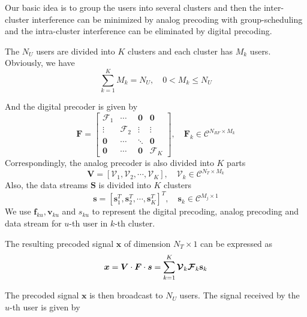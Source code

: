 \documentclass[conference]{IEEEtran}
\begin{document}
Our basic idea is to group the users into several clusters and then the inter-cluster interference can be minimized by analog precoding with group-scheduling and the intra-cluster interference can be eliminated by digital precoding.

The $N_U$ users are divided into $K$ clusters and each cluster has $M_k$ users. Obviously, we have
\begin{equation}
	\sum_{k=1}^{K} M_k = N_U, \quad 0< M_k\leq N_U
\end{equation}

And the digital precoder is given by 
\begin{equation}
\bm{F} = 
\begin{bmatrix}
\bm{\mathcal{F}}_1&\cdots & \bm{0}&\bm{0}\\
\vdots & \bm{\mathcal{F}}_2 & \vdots&\vdots \\
\bm{0}&\cdots&\ddots &\bm{0}\\
\bm{0}&\cdots & \bm{0}&\bm{\mathcal{F}}_K
\end{bmatrix}
,\quad
\bm{F}_k \in \mathcal{C}^{N_{RF}\times M_k}
\end{equation}
Correspondingly, the analog precoder is also divided into $K$ parts
\begin{equation}
	\bm{V} = \left[\bm{\mathcal{V}}_1, \bm{\mathcal{V}}_2,\cdots, \bm{\mathcal{V}}_{K}\right], \quad \bm{\mathcal{V}}_k\in \mathcal{C}^{N_T\times M_k}
\end{equation}
Also, the data streams $\bm{S}$ is divided into $K$ clusters
\begin{equation}
\bm{s} = \left[{\mathbf{s}}_1^T, {\mathbf{s}}_2^T,\cdots, \mathbf{s}_{K}^T\right]^T, \quad \mathbf{s}_k\in \mathcal{C}^{M_j\times 1}
\end{equation}
We use $\bm{f}_{ku}, \bm{v}_{ku}$ and $s_{ku}$ to represent the digital precoding, analog precoding and data stream for $u$-th user in $k$-th cluster.

The resulting precoded signal $\bm x$ of dimension $N_T\times 1$  can be expressed as
\begin{equation}{\label{eq:transx}}
{\bm x} =  \bm{V}\cdot \bm{F}\cdot\bm{s} =\sum_{k=1}^K \bm{\mathcal{V}}_k \bm{\mathcal{F}}_k \mathbf{s}_k
\end{equation}

The precoded signal $\bm x$ is then broadcast to $N_U$ users. The signal received by the $u$-th user is given by
\end{document}
